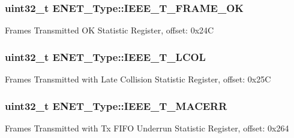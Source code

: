 \subsubsection[{\texorpdfstring{I\+E\+E\+E\+\_\+\+T\+\_\+\+F\+R\+A\+M\+E\+\_\+\+OK}{IEEE_T_FRAME_OK}}]{ uint32\+\_\+t E\+N\+E\+T\+\_\+\+Type\+::\+I\+E\+E\+E\+\_\+\+T\+\_\+\+F\+R\+A\+M\+E\+\_\+\+OK}\hypertarget{structENET__Type_a4f8e6f8a3d49643d3bd37a373c22831a}{}\label{structENET__Type_a4f8e6f8a3d49643d3bd37a373c22831a}
Frames Transmitted OK Statistic Register, offset\+: 0x24C 
\subsubsection[{\texorpdfstring{I\+E\+E\+E\+\_\+\+T\+\_\+\+L\+C\+OL}{IEEE_T_LCOL}}]{ uint32\+\_\+t E\+N\+E\+T\+\_\+\+Type\+::\+I\+E\+E\+E\+\_\+\+T\+\_\+\+L\+C\+OL}\hypertarget{structENET__Type_add5ce13dee894fc30de516f0d301ad15}{}\label{structENET__Type_add5ce13dee894fc30de516f0d301ad15}
Frames Transmitted with Late Collision Statistic Register, offset\+: 0x25C 
\subsubsection[{\texorpdfstring{I\+E\+E\+E\+\_\+\+T\+\_\+\+M\+A\+C\+E\+RR}{IEEE_T_MACERR}}]{ uint32\+\_\+t E\+N\+E\+T\+\_\+\+Type\+::\+I\+E\+E\+E\+\_\+\+T\+\_\+\+M\+A\+C\+E\+RR}\hypertarget{structENET__Type_a9c45f8f12b14e155600283de3b926377}{}\label{structENET__Type_a9c45f8f12b14e155600283de3b926377}
Frames Transmitted with Tx F\+I\+FO Underrun Statistic Register, offset\+: 0x264 

